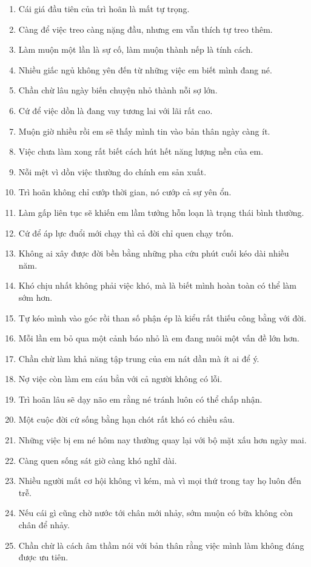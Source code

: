 \begin{enumerate}[leftmargin=*,resume]
\item Cái giá đầu tiên của trì hoãn là mất tự trọng.
\item Càng để việc treo càng nặng đầu, nhưng em vẫn thích tự treo thêm.
\item Làm muộn một lần là sự cố, làm muộn thành nếp là tính cách.
\item Nhiều giấc ngủ không yên đến từ những việc em biết mình đang né.
\item Chần chừ lâu ngày biến chuyện nhỏ thành nỗi sợ lớn.
\item Cứ để việc dồn là đang vay tương lai với lãi rất cao.
\item Muộn giờ nhiều rồi em sẽ thấy mình tin vào bản thân ngày càng ít.
\item Việc chưa làm xong rất biết cách hút hết năng lượng nền của em.
\item Nỗi mệt vì dồn việc thường do chính em sản xuất.
\item Trì hoãn không chỉ cướp thời gian, nó cướp cả sự yên ổn.
\item Làm gấp liên tục sẽ khiến em lầm tưởng hỗn loạn là trạng thái bình thường.
\item Cứ để áp lực đuổi mới chạy thì cả đời chỉ quen chạy trốn.
\item Không ai xây được đời bền bằng những pha cứu phút cuối kéo dài nhiều năm.
\item Khó chịu nhất không phải việc khó, mà là biết mình hoàn toàn có thể làm sớm hơn.
\item Tự kéo mình vào góc rồi than số phận ép là kiểu rất thiếu công bằng với đời.
\item Mỗi lần em bỏ qua một cảnh báo nhỏ là em đang nuôi một vấn đề lớn hơn.
\item Chần chừ làm khả năng tập trung của em nát dần mà ít ai để ý.
\item Nợ việc còn làm em cáu bẳn với cả người không có lỗi.
\item Trì hoãn lâu sẽ dạy não em rằng né tránh luôn có thể chấp nhận.
\item Một cuộc đời cứ sống bằng hạn chót rất khó có chiều sâu.
\item Những việc bị em né hôm nay thường quay lại với bộ mặt xấu hơn ngày mai.
\item Càng quen sống sát giờ càng khó nghĩ dài.
\item Nhiều người mất cơ hội không vì kém, mà vì mọi thứ trong tay họ luôn đến trễ.
\item Nếu cái gì cũng chờ nước tới chân mới nhảy, sớm muộn có bữa không còn chân để nhảy.
\item Chần chừ là cách âm thầm nói với bản thân rằng việc mình làm không đáng được ưu tiên.
\end{enumerate}

